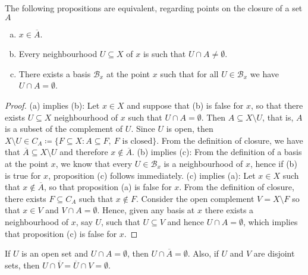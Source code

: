 \begin{proposition}\label{prop: closure equivalent prop}
The following propositions are equivalent, regarding points on the closure of a
set \(A\)
\begin{enumerate}[(a)]\setlength\itemsep{0em}
\item \(x \in \overline A\).

\item Every neighbourhood \(U \subseteq X\) of \(x\) is such that \(U
  \cap A \neq \emptyset\).

\item There exists a basis \(\mathcal B_x\) at the point \(x\) such that for all
  \(U \in \mathcal B_x\) we have \(U \cap A = \emptyset\).
\end{enumerate}
\end{proposition}

\begin{proof}
(a) implies (b): Let \(x \in X\) and suppose that (b) is false for \(x\), so
that there exists \(U \subseteq X\) neighbourhood of \(x\) such that \(U \cap A
= \emptyset\). Then \(A \subseteq X \setminus U\), that is, \(A\) is a subset of
the complement of \(U\). Since \(U\) is open, then \(X \setminus U \in C_A
\coloneq \{F \subseteq X : A \subseteq F,\ F \text{ is closed}\}\). From the
definition of closure, we have that \(\overline A \subseteq X \setminus U\) and
therefore \(x \not\in \overline A\). (b) implies (c): From the definition of a
basis at the point \(x\), we know that every \(U \in \mathcal B_x\) is a
neighbourhood of \(x\), hence if (b) is true for \(x\), proposition (c) follows
immediately. (c) implies (a): Let \(x \in X\) such that \(x \not\in \overline
A\), so that proposition (a) is false for \(x\).  From the definition of
closure, there exists \(F \subseteq C_A\) such that \(x \not\in F\). Consider
the open complement \(V = X \setminus F\) so that \(x \in V\) and \(V \cap A =
\emptyset\). Hence, given any basis at \(x\) there exists a neighbourhood of
\(x\), say \(U\), such that \(U \subseteq V\) and hence \(U \cap A =
\emptyset\), which implies that proposition (c) is false for \(x\).
\end{proof}

\begin{corollary}\label{cor: disjoint closure persistence}
If \(U\) is an open set and \(U \cap A = \emptyset\), then \(U \cap \overline
A = \emptyset\). Also, if \(U\) and \(V\) are disjoint sets, then \(U \cap
\overline V = \overline U \cap V = \emptyset\).
\end{corollary}

